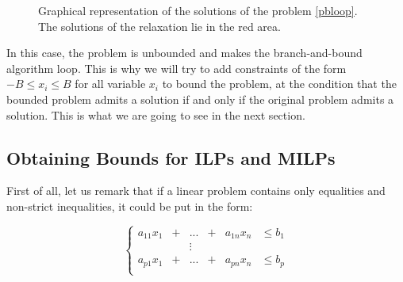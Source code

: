 \documentclass{article}
\begin{document}
\begin{figure}[h]
  \centering


  \label{bbloop}
  \caption{Graphical representation of the solutions of the problem
           \ref{pbloop}. The solutions of the relaxation lie in the red area.}
\end{figure}

In this case, the problem is unbounded and makes the branch-and-bound algorithm
loop. This is why we will try to add constraints of the form $-B \leqslant x_i
\leqslant B$ for all variable $x_i$ to bound the problem, at the condition that
the bounded problem admits a solution if and only if the original problem admits
a solution. This is what we are going to see in the next section.

\subsection{Obtaining Bounds for ILPs and MILPs}
\label{schrijverbnd}
First of all, let us remark that if a linear problem contains only equalities and 
non-strict inequalities, 
it could be put in the form:

\begin{displaymath}
  \left\{
  \begin{array}{cccccl}
    a_{11} x_1 & + & ...    & + & a_{1n} x_n & \leqslant b_1 \\
               &   & \vdots &   &            &               \\
    a_{p1} x_1 & + & ...    & + & a_{pn} x_n & \leqslant b_p \\
  \end{array}
  \right.
\end{displaymath}
\end{document}
